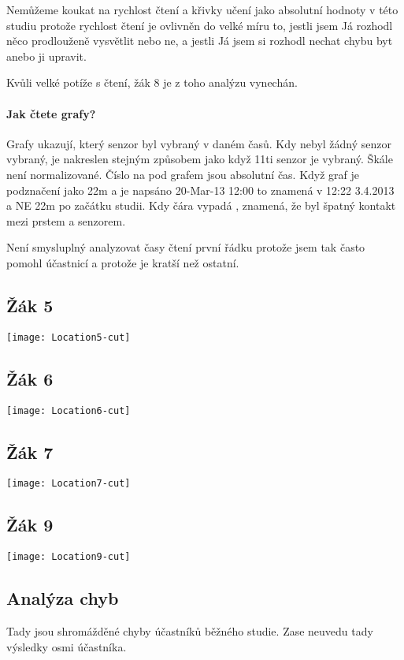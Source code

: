 Nemůžeme koukat na rychlost čtení a křivky učení jako absolutní hodnoty v této studiu protože rychlost čtení je ovlivněn do velké míru to, jestli jsem Já rozhodl něco prodlouženě vysvětlit nebo ne, a jestli Já jsem si rozhodl nechat chybu byt anebo ji upravit.

Kvůli velké potíže s čtení, žák 8 je z toho analýzu vynechán.

\paragraph{Jak čtete grafy?}  Grafy ukazují, který senzor byl vybraný v daném časů.  Kdy nebyl žádný senzor vybraný, je nakreslen stejným způsobem jako když 11ti senzor je vybraný.  Škále není normalizované. Číslo na pod grafem jsou absolutní čas.  Když graf je podznačení jako 22m a je napsáno 20-Mar-13 12:00 to znamená v 12:22 3.4.2013 a NE 22m po začátku studii.  Kdy čára vypadá , znamená, že byl špatný kontakt mezi prstem a senzorem.

Není smysluplný analyzovat časy čtení první řádku protože jsem tak často pomohl účastnicí a protože je kratší než ostatní.


\subsection{Žák 5}
\texttt{[image: Location5-cut]}
\subsection{Žák 6}
\texttt{[image: Location6-cut]}
\subsection{Žák 7}
\texttt{[image: Location7-cut]}
\subsection{Žák 9}
\texttt{[image: Location9-cut]}

\subsection{Analýza chyb}

Tady jsou shromážděné chyby účastníků běžného studie.  Zase neuvedu tady výsledky osmi účastníka.

